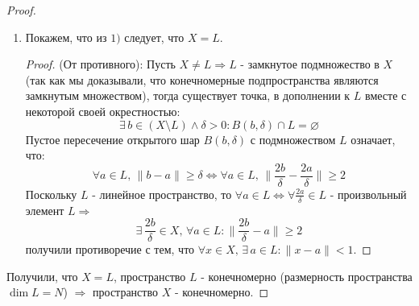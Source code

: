 \documentclass[12pt]{article}
\newcommand{\MN}{\mathbb{N}}
\newcommand{\VN}{\varnothing}
\theoremstyle{definition}
\newcommand{\smallerrel}[1]{\mathrel{\mathpalette\smallerrelaux{#1}}}
\newcommand{\smallerrelaux}[2]{\raisebox{.1ex}{\scalebox{.75}{$#1#2$}}}
\newcommand{\smallin}{\smallerrel{\in}}
\begin{document}
\begin{proof}
\begin{enumerate}[label ={\arabic*)}]
		Пусть $B(0,r) \subset  \textstyle \bigcup\limits_{a \in L}B(a,1)$, тогда $B(0,2r) \subset  \textstyle \bigcup\limits_{a \in L}B(a,1)$. 
		\begin{proof}
			Пусть $x \in B(0,2r)$, тогда: 
			$$ 
				\|x\| < 2r \Rightarrow \Big\|\dfrac{x}{2}\Big\| <r \Rightarrow \dfrac{x}{2} \in B(0,r) \subset \bigcup\limits_{a \in L}B(a,1) \Rightarrow \exists \, a \in L \colon \Big\|\dfrac{x}{2} - a\Big\| < 1 \Rightarrow \|x - 2a\| < 2
			$$
			Получаем, что $x \in B(2a,2)$, $2a \in L$, так как $L$ - это линейное пространство. Сдвинем этот шар: 
			$$
				B(2a,2) - 2a = B(0,2) \subset \textstyle \bigcup\limits_{c \in L}B(c,1)
			$$
			где последнее верно по построению $L$. Тогда:
			$$
				B(2a,2) \subset \textstyle \bigcup\limits_{c\in L}B(\underbrace{c + 2a}_{\smallin L},1) \Rightarrow B(2a,2) \subset \textstyle \bigcup\limits_{b\in L}B(b,1)
			$$
			где $\forall c, a \in L \Rightarrow c + 2a \in L$, так как $L$ - линейное пространство. Таким образом 
			$$
				\forall x \in B(0,2r) \Rightarrow x \in \textstyle \bigcup\limits_{a\in L}B(a,1) \Rightarrow B(0,2r) \subset \textstyle \bigcup\limits_{a\in L}B(a,1)
			$$
		\end{proof}
		Если закрыт шар радиуса $2$, то из утверждения выше следует, что закрыт шар радиуса $4$:
		$$ 
			B(0,2) \subset \textstyle \bigcup\limits_{a \in L} B(a,1) \Rightarrow B(0,4) \subset \textstyle \bigcup\limits_{a \in L} B(a,1) \Rightarrow  B(0,8) \subset \textstyle \bigcup\limits_{a \in L} B(a,1) \Rightarrow \dotsc
		$$
		Получаем, что 
		$$
			\forall n \in \MN, \, B(0, 2^n) \subset \textstyle \bigcup\limits_{a \in L} B(a,1) \Rightarrow X \subset \textstyle \bigcup\limits_{a \in L} B(a,1)
		$$
		так как любая точка пространства $X$ лежит в каком-то шаре $B(0,2^n)$. Итого получаем:
		$$
			\forall x \in X, \, \exists \, a \in L \colon \|x - a\| < 1
		$$
		\item Покажем, что из $1)$ следует, что $X = L$.
		\begin{proof}
			(От противного): Пусть $X \neq L \Rightarrow L$ - замкнутое подмножество в $X$ (так как мы доказывали, что конечномерные подпространства являются замкнутым множеством), тогда существует точка, в дополнении к $L$ вместе с некоторой своей окрестностью:
			$$
				\exists \, b \in (X \setminus L) \wedge \delta >0 \colon B(b, \delta) \cap L  = \VN
			$$
			Пустое пересечение открытого шар $B(b, \delta)$ с подмножеством $L$ означает, что:
			$$
				\forall a \in L, \, \|b-a\| \geq \delta \Leftrightarrow \forall a \in L, \,  \bigg\|\dfrac{2b}{\delta} - \dfrac{2a}{\delta} \bigg\| \geq 2
			$$
			Поскольку $L$ - линейное пространство, то $\forall a \in L \Leftrightarrow \forall \tfrac{2a}{\delta} \in L$ - произвольный элемент $L \Rightarrow$ 
			$$
				\exists \, \dfrac{2b}{\delta} \in X, \, \forall a \in L \colon \bigg\|\dfrac{2b}{\delta} - a \bigg\| \geq 2 
			$$  
			получили противоречие с тем, что $\forall x \in X, \, \exists \, a \in L \colon \|x - a\| < 1$.
		\end{proof}
	\end{enumerate}
	Получили, что $X = L$, пространство $L$ - конечномерно (размерность пространства $\dim{L} = N$) $\Rightarrow$ пространство $X$ - конечномерно.
\end{proof}
\end{document}
